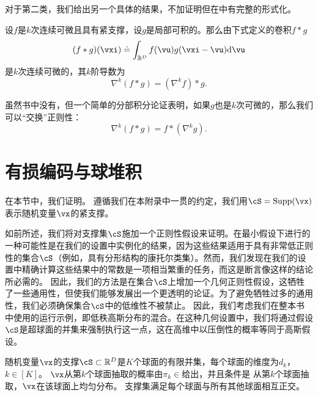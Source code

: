 \documentclass[../../book-main_zh.tex]{subfiles}
\begin{document}
对于第二类，我们给出另一个具体的结果，不加证明但在\cite{brezis2011functional}中有完整的形式化。
\begin{proposition}\label{prop:diff_convolution}
    设\(f\)是\(k\)次连续可微且具有紧支撑，设\(g\)是局部可积的。那么由下式定义的卷积\(f * g\)
    \begin{equation}
        (f * g)(\vxi) \doteq \int_{\R^{D}}f(\vu)g(\vxi - \vu)\odif{\vu}
    \end{equation}
    是\(k\)次连续可微的，其\(k\)阶导数为
    \begin{equation}
        \nabla^{k}(f * g) =(\nabla^{k}f) * g. 
    \end{equation}
\end{proposition}
虽然书中没有，但一个简单的分部积分论证表明，如果\(g\)也是\(k\)次可微的，那么我们可以“交换”正则性：
\begin{equation}
    \nabla^{k}(f * g) = f * (\nabla^{k} g).
\end{equation}


\section{有损编码与球堆积}\label{app:rate-distortion-covering}

在本节中，我们证明。
遵循我们在本附录中一贯的约定，我们用$\cS = \Supp(\vx)$表示随机变量$\vx$的紧支撑。

如前所述，我们将对支撑集$\cS$施加一个正则性假设来证明。在最小假设下进行的一种可能性是在我们的设置中实例化\cite{Riegler2018-jh,Riegler2023-rr}的结果，因为这些结果适用于具有非常低正则性的集合$\cS$（例如，具有分形结构的康托尔类集）。然而，我们发现在我们的设置中精确计算这些结果中的常数是一项相当繁重的任务，而这是断言像这样的结论所必需的。
因此，我们的方法是在集合$\cS$上增加一个几何正则性假设，这牺牲了一些通用性，但使我们能够发展出一个更透明的论证。为了避免牺牲过多的通用性，我们必须确保集合$\cS$中的低维性不被禁止。
因此，我们考虑我们在整本书中使用的运行示例，即低秩高斯分布的混合。在这种几何设置中，我们将通过假设$\cS$是超球面的并集来强制执行这一点，这在高维中以压倒性的概率等同于高斯假设。

\begin{assumption}\label{assumption:union-of-spheres}
    随机变量$\vx$的支撑$\cS \subset \R^D$是$K$个球面的有限并集，每个球面的维度为$d_k$，$k \in [K]$。
    $\vx$从第$k$个球面抽取的概率由$\pi_k \in$给出，并且条件是 从第$k$个球面抽取，$\vx$在该球面上均匀分布。
    支撑集满足每个球面与所有其他球面相互正交。
\end{assumption}
\end{document}
